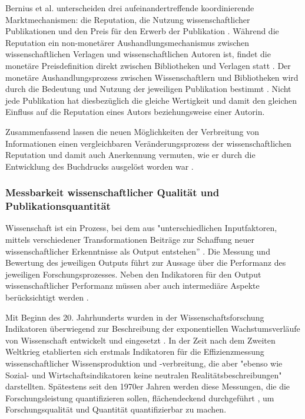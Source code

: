 Bernius et al. unterscheiden drei aufeinandertreffende koordinierende Marktmechanismen: die Reputation, die Nutzung wissenschaftlicher Publikationen und den Preis für den Erwerb der Publikation \cite{cite:21a}. Während die Reputation ein non-monetärer Aushandlungsmechanismus zwischen wissenschaftlichen Verlagen und wissenschaftlichen Autoren ist, findet die monetäre Preisdefinition direkt zwischen Bibliotheken und Verlagen statt \cite{EuropeanCommission_sciencepub_2006}. Der monetäre Aushandlungsprozess zwischen Wissenschaftlern und Bibliotheken wird durch die Bedeutung und Nutzung der jeweiligen Publikation bestimmt \cite{cite:21a}. Nicht jede Publikation hat diesbezüglich die gleiche Wertigkeit \cite{2009_publikationsverhalten} und damit den gleichen Einfluss auf die Reputation eines Autors beziehungsweise einer Autorin.

Zusammenfassend lassen die neuen Möglichkeiten der Verbreitung von Informationen einen vergleichbaren Veränderungsprozess der wissenschaftlichen Reputation und damit auch Anerkennung vermuten, wie er durch die Entwicklung des Buchdrucks ausgelöst worden war \cite{hanekop_2006}.

\subsubsection{Messbarkeit wissenschaftlicher Qualität und Publikationsquantität}

Wissenschaft ist ein Prozess, bei dem aus "unterschiedlichen Inputfaktoren, mittels verschiedener Transformationen Beiträge zur Schaffung neuer wissenschaftlicher Erkenntnisse als Output entstehen” \cite{Jansen_2007}. Die Messung und Bewertung des jeweiligen Outputs führt zur Aussage über die Performanz des jeweiligen Forschungsprozesses. Neben den Indikatoren für den Output wissenschaftlicher Performanz müssen aber auch intermediäre Aspekte berücksichtigt werden \cite{schmoch_2009}.

Mit Beginn des 20. Jahrhunderts wurden in der Wissenschaftsforschung Indikatoren überwiegend zur Beschreibung der exponentiellen Wachstumsverläufe von Wissenschaft entwickelt und eingesetzt \cite{Hornbostel_1997}. In der Zeit nach dem Zweiten Weltkrieg etablierten sich erstmals Indikatoren für die Effizienzmessung wissenschaftlicher Wissensproduktion und -verbreitung, die aber "ebenso wie Sozial- und Wirtschaftsindikatoren keine neutralen Realitätsbeschreibungen" \cite{Hornbostel_1997} darstellten. Spätestens seit den 1970er Jahren werden diese Messungen, die die Forschungsleistung quantifizieren sollen, flächendeckend durchgeführt \cite{Hornbostel_1997}, um Forschungsqualität und Quantität quantifizierbar zu machen.

